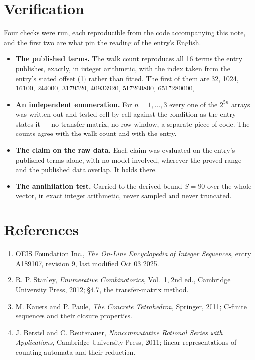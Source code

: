 \documentclass[11pt]{article}
\theoremstyle{definition}
\begin{document}
\section{Verification}

Four checks were run, each reproducible from the code accompanying this note, and the first two are what pin the reading of the entry's English.

\begin{itemize}

\item {\bfseries The published terms.} The walk count reproduces all 16 terms the entry publishes, exactly, in integer arithmetic, with the index taken from the entry's stated offset (1) rather than fitted. The first of them are 32, 1024, 16100, 244000, 3179520, 40933920, 517260800, 6517280000,~\dots

\item {\bfseries An independent enumeration.} For $n = 1,\dots,3$ every one of the $2^{5n}$ arrays was written out and tested cell by cell against the condition as the entry states it --- no transfer matrix, no row window, a separate piece of code. The counts agree with the walk count and with the entry.

\item {\bfseries The claim on the raw data.} Each claim was evaluated on the entry's published terms alone, with no model involved, wherever the proved range and the published data overlap. It holds there.

\item {\bfseries The annihilation test.} Carried to the derived bound $S = 90$ over the whole vector, in exact integer arithmetic, never sampled and never truncated.

\end{itemize}

\section{References}

\begin{enumerate}

\item OEIS Foundation Inc., \emph{The On-Line Encyclopedia of Integer Sequences}, entry \href{https://oeis.org/A189107}{A189107}, revision 9, last modified Oct 03 2025.

\item R. P. Stanley, \emph{Enumerative Combinatorics}, Vol.~1, 2nd ed., Cambridge University Press, 2012; \S4.7, the transfer-matrix method.

\item M. Kauers and P. Paule, \emph{The Concrete Tetrahedron}, Springer, 2011; C-finite sequences and their closure properties.

\item J. Berstel and C. Reutenauer, \emph{Noncommutative Rational Series with Applications}, Cambridge University Press, 2011; linear representations of counting automata and their reduction.

\end{enumerate}
\end{document}

